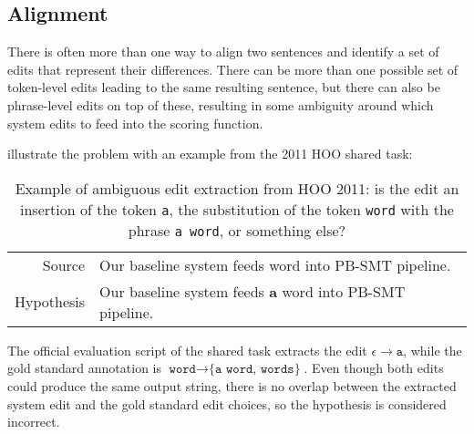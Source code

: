 \subsection{Alignment}
There is often more than one way to align two sentences and identify a set of edits that represent their differences. There can be more than one possible set of token-level edits leading to the same resulting sentence, but there can also be phrase-level edits on top of these, resulting in some ambiguity around which system edits to feed into the scoring function.

\citet{Dahlmeier2012BetterCorrection} illustrate the problem with an example from the 2011 HOO shared task:

\begin{table}[h]
\centering
\begin{tabular}{ r l }
\tabularnewline \hline \hline
Source & Our baseline system feeds word into PB-SMT pipeline. \\
Hypothesis & Our baseline system feeds \textbf{a} word into PB-SMT pipeline. \\
\hline
\end{tabular}
\caption{Example of ambiguous edit extraction from HOO 2011: is the edit an insertion of the token \texttt{a}, the substitution of the token \texttt{word} with the phrase \texttt{a word}, or something else?}
\label{tab:maxmatch-hoo-2011-example}
\end{table}

The official evaluation script of the shared task extracts the edit $\epsilon \rightarrow \texttt{a}$, while the gold standard annotation is $\texttt{word} \rightarrow \texttt{\{a word, words\}}$. Even though both edits could produce the same output string, there is no overlap between the extracted system edit and the gold standard edit choices, so the hypothesis is considered incorrect.


